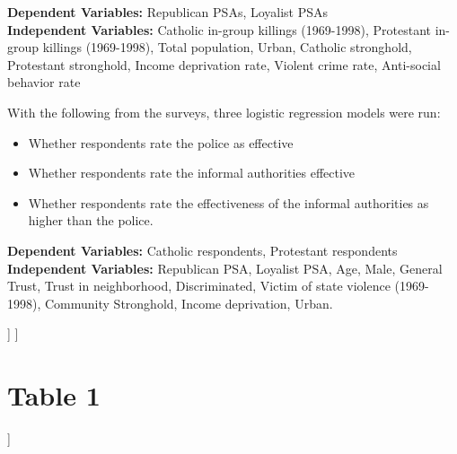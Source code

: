 \documentclass[12pt,letterpaper]{article}
\begin{document}
\textbf{Dependent Variables:} Republican PSAs, Loyalist PSAs \\
\textbf{Independent Variables:} Catholic in-group killings (1969-1998), Protestant in-group killings (1969-1998), Total population, Urban, Catholic stronghold, Protestant stronghold, Income deprivation rate, Violent crime rate, Anti-social behavior rate

With the following from the surveys, three logistic regression models were run:
\begin{itemize}
	\item Whether respondents rate the police as effective
	\item Whether respondents rate the informal authorities effective
	\item Whether respondents rate the effectiveness of the informal authorities as higher than the police.
\end{itemize}

\textbf{Dependent Variables:} Catholic respondents, Protestant respondents \\
\textbf{Independent Variables:} Republican PSA, Loyalist PSA, Age, Male, General Trust, Trust in neighborhood, Discriminated, Victim of state violence (1969-1998), Community Stronghold, Income deprivation, Urban.

	]
		]

\newpage
\section*{Table 1}
		]
	
\end{document}
